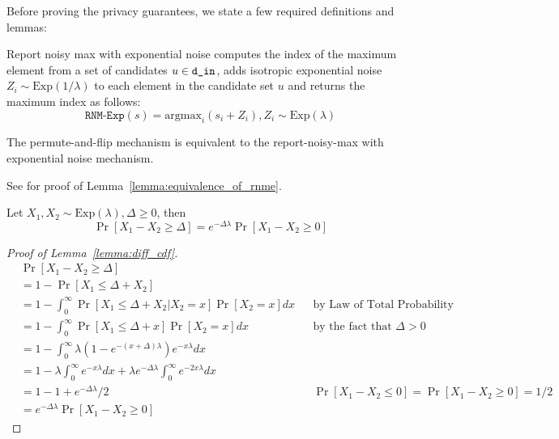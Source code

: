 \documentclass{article}
\begin{document}
Before proving the privacy guarantees, we state a few required definitions and lemmas:
\begin{definition}
    \label{definition:rnm-exp}
    Report noisy max with exponential noise computes the index of the maximum element from a set of candidates $u \in \texttt{d\_in} $,
    adds isotropic exponential noise $Z_i \sim \mathrm{Exp}(1/\lambda)$ to each element in the candidate set $u$ and returns the maximum index as follows:
    \begin{equation}
        \texttt{RNM-Exp}(s) = \mathrm{argmax}_i(s_i + Z_i), Z_i \sim \mathrm{Exp}(\lambda)
    \end{equation}
\end{definition}

\begin{lemma}
    \label{lemma:equivalence_of_rnme}
    The permute-and-flip mechanism is equivalent to the report-noisy-max with exponential noise mechanism.
\end{lemma}
See \cite{ding2021permute} for proof of Lemma~\ref{lemma:equivalence_of_rnme}.


\begin{lemma}
    \label{lemma:diff_cdf}
    Let $X_1, X_2 \sim \mathrm{Exp}(\lambda), \Delta \geq 0$, then
    \begin{equation}
        \Pr[X_1 - X_2 \geq \Delta] = e^{-\Delta\lambda} \Pr[X_1 - X_2 \geq 0]
    \end{equation}
\end{lemma}

\begin{proof}[Proof of Lemma~\ref{lemma:diff_cdf}]
    \begin{align}
    & \Pr[X_1 - X_2 \geq \Delta] \\
    & = 1 - \Pr[X_1 \leq \Delta + X_2] \\
    & = 1 - \int^\infty_0 \Pr[X_1 \leq \Delta + X_2 | X_2 = x] \Pr[X_2 = x] dx && \text{by Law of Total Probability} \\
    & = 1 - \int^\infty_0 \Pr[X_1 \leq \Delta + x] \Pr[X_2 = x] dx  && \text{by the fact that } \Delta > 0 \\
    & = 1 - \int^\infty_0 \lambda(1 - e^{-(x + \Delta)\lambda})e^{-x\lambda}dx  \\
    & = 1 - \lambda \int^\infty_0 e^{-x\lambda} dx + \lambda e^{-\Delta\lambda} \int_0^\infty e^{-2x\lambda}dx \\
    & = 1 - 1 + e^{-\Delta\lambda} / 2 && \text{$\Pr[X_1 - X_2 \leq 0] = \Pr[X_1 - X_2 \geq 0] = 1/2$} \\
    & = e ^{-\Delta\lambda} \Pr[X_1 - X_2 \geq 0]
    \end{align}
\end{proof}
\end{document}
